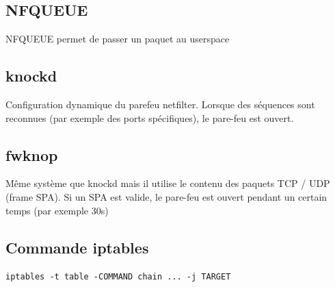 \documentclass[resume]{subfiles}
\begin{document}
\subsection{NFQUEUE}
NFQUEUE permet de passer un paquet au userspace
\subsection{knockd}
Configuration dynamique du parefeu netfilter. Lorsque des séquences sont reconnues (par exemple des ports spécifiques), le pare-feu est ouvert.
\subsection{fwknop}
Même système que knockd mais il utilise le contenu des paquets TCP / UDP (frame SPA). Si un SPA est valide, le pare-feu est ouvert pendant un certain temps (par exemple 30s)

\subsection{Commande iptables}
\begin{center}
\verb!iptables -t table -COMMAND chain ... -j TARGET!
\end{center}
\end{document}
